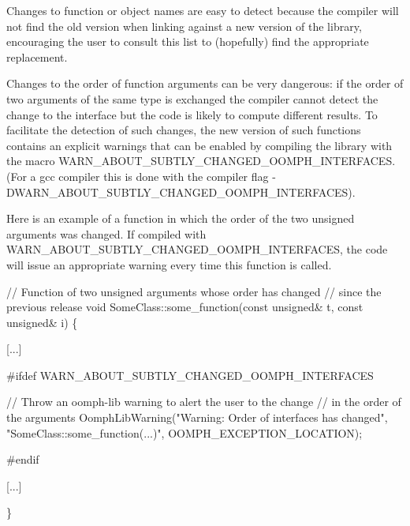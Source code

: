 \begin{DoxyEnumerate}
\end{DoxyEnumerate}Changes to function or object names are easy to detect because the compiler will not find the old version when linking against a new version of the library, encouraging the user to consult this list to (hopefully) find the appropriate replacement.

Changes to the order of function arguments can be very dangerous\+: if the order of two arguments of the same type is exchanged the compiler cannot detect the change to the interface but the code is likely to compute different results. To facilitate the detection of such changes, the new version of such functions contains an explicit warnings that can be enabled by compiling the library with the macro {\ttfamily W\+A\+R\+N\+\_\+\+A\+B\+O\+U\+T\+\_\+\+S\+U\+B\+T\+L\+Y\+\_\+\+C\+H\+A\+N\+G\+E\+D\+\_\+\+O\+O\+M\+P\+H\+\_\+\+I\+N\+T\+E\+R\+F\+A\+C\+ES}. (For a gcc compiler this is done with the compiler flag {\ttfamily -\/\+D\+W\+A\+R\+N\+\_\+\+A\+B\+O\+U\+T\+\_\+\+S\+U\+B\+T\+L\+Y\+\_\+\+C\+H\+A\+N\+G\+E\+D\+\_\+\+O\+O\+M\+P\+H\+\_\+\+I\+N\+T\+E\+R\+F\+A\+C\+ES}).

Here is an example of a function in which the order of the two unsigned arguments was changed. If compiled with {\ttfamily W\+A\+R\+N\+\_\+\+A\+B\+O\+U\+T\+\_\+\+S\+U\+B\+T\+L\+Y\+\_\+\+C\+H\+A\+N\+G\+E\+D\+\_\+\+O\+O\+M\+P\+H\+\_\+\+I\+N\+T\+E\+R\+F\+A\+C\+ES}, the code will issue an appropriate warning every time this function is called.


\begin{DoxyCode}
\textcolor{comment}{// Function of two unsigned arguments whose order has changed}
\textcolor{comment}{// since the previous release}
\textcolor{keywordtype}{void} SomeClass::some\_function(\textcolor{keyword}{const} \textcolor{keywordtype}{unsigned}& t, \textcolor{keyword}{const} \textcolor{keywordtype}{unsigned}& i)
\{

  [...]

\textcolor{preprocessor}{ #ifdef WARN\_ABOUT\_SUBTLY\_CHANGED\_OOMPH\_INTERFACES}

   \textcolor{comment}{// Throw an oomph-lib warning to alert the user to the change}
   \textcolor{comment}{// in the order of the arguments}
   OomphLibWarning(\textcolor{stringliteral}{"Warning: Order of interfaces has changed"},
                   \textcolor{stringliteral}{"SomeClass::some\_function(...)"},
                   OOMPH\_EXCEPTION\_LOCATION);

\textcolor{preprocessor}{ #endif}

  [...]

\}
\end{DoxyCode}



